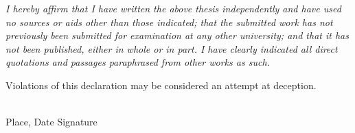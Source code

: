 \clearpage
\thispagestyle{empty}
\vspace*{3cm}

\noindent\textit{I hereby affirm that I have written the above thesis independently and have used no sources or aids other than those indicated; that the submitted work has not previously been submitted for examination at any other university; and that it has not been published, either in whole or in part. I have clearly indicated all direct quotations and passages paraphrased from other works as such.}

\vspace{1cm}
\noindent Violations of this declaration may be considered an attempt at deception.

\vspace{3cm}
\noindent\makebox[6cm]{\hrulefill} \hfill \makebox[6cm]{\hrulefill}\\
\noindent Place, Date \hfill Signature
